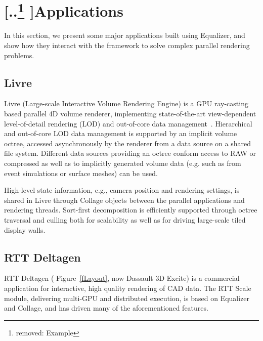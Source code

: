 \documentclass[10pt,journal,compsoc]{IEEEtran}
\newcommand{\fig}[1]{Figure~\ref{#1}}
\providecommand{\DIFaddtex}[1]{{\protect\color{blue} \sf #1}} %
\providecommand{\DIFdeltex}[1]{{\protect\color{red} [..\footnote{removed: #1} ]}} %
\providecommand{\DIFaddbegin}{} %
\providecommand{\DIFaddend}{} %
\providecommand{\DIFdelbegin}{} %
\providecommand{\DIFdelend}{} %
\providecommand{\DIFadd}[1]{\texorpdfstring{\DIFaddtex{#1}}{#1}} %
\providecommand{\DIFdel}[1]{\texorpdfstring{\DIFdeltex{#1}}{}} %
\newcommand{\DIFscaledelfig}{0.5}
\newlength{\DIFdelgraphicswidth} %
\newlength{\DIFdelgraphicsheight} %
\newcommand{\DIFaddincludegraphics}[2][]{{\color{blue}\fbox{\DIFOincludegraphics[#1]{#2}}}} %
\newcommand{\DIFdelincludegraphics}[2][]{%
\sbox{\DIFdelgraphicsbox}{\DIFOincludegraphics[#1]{#2}}%
\settoboxwidth{\DIFdelgraphicswidth}{\DIFdelgraphicsbox} %
\settoboxtotalheight{\DIFdelgraphicsheight}{\DIFdelgraphicsbox} %
\scalebox{\DIFscaledelfig}{%
\parbox[b]{\DIFdelgraphicswidth}{\usebox{\DIFdelgraphicsbox}\\[-\baselineskip] \rule{\DIFdelgraphicswidth}{0em}}\llap{\resizebox{\DIFdelgraphicswidth}{\DIFdelgraphicsheight}{%
\setlength{\unitlength}{\DIFdelgraphicswidth}%
\begin{picture}(1,1)%
\thicklines\linethickness{2pt} %
{\color[rgb]{1,0,0}\put(0,0){\framebox(1,1){}}}%
{\color[rgb]{1,0,0}\put(0,0){\line( 1,1){1}}}%
{\color[rgb]{1,0,0}\put(0,1){\line(1,-1){1}}}%
\end{picture}%
}\hspace*{3pt}}} %
} %
\DeclareRobustCommand{\DIFaddbegin}{\DIFOaddbegin \let\includegraphics\DIFaddincludegraphics} %
\DeclareRobustCommand{\DIFaddend}{\DIFOaddend \let\includegraphics\DIFOincludegraphics} %
\DeclareRobustCommand{\DIFdelbegin}{\DIFOdelbegin \let\includegraphics\DIFdelincludegraphics} %
\DeclareRobustCommand{\DIFdelend}{\DIFOaddend \let\includegraphics\DIFOincludegraphics} %
\begin{document}
\section{\DIFdelbegin \DIFdel{Example }\DIFdelend Applications} \label{sApplications}

In this section, we present some major applications built using
\textsf{Equalizer}, and show how they interact with the framework to solve
complex parallel rendering problems.

\subsection{Livre}

Livre (Large-scale Interactive Volume Rendering Engine) is a GPU ray-casting based parallel
4D volume renderer, implementing state-of-the-art view-dependent level-of-detail rendering (LOD)
and out-of-core data management~\cite{EHKRW:06}. Hierarchical and out-of-core LOD
data management is supported by an implicit volume octree, accessed asynchronously
by the renderer from a data source on a shared file system. Different data sources providing
an octree conform access to RAW or compressed as well as to implicitly generated volume data
(e.g. such as from event simulations or surface meshes) can be used.

High-level state information, e.g., camera position and rendering settings, is shared in Livre
through \textsf{Collage} objects between the parallel applications and rendering threads.
Sort-first decomposition is efficiently supported through octree traversal and culling both
for scalability as well as for driving large-scale tiled display walls.

\subsection{RTT Deltagen}

RTT Deltagen (\DIFaddbegin \DIFadd{\fig{fLayout}, }\DIFaddend now Dassault 3D Excite) is a commercial
application for interactive, high quality rendering of CAD data. The RTT Scale
module, delivering multi-GPU and distributed execution, is based on
\textsf{Equalizer} and \textsf{Collage}, and has driven many of the
aforementioned features.
\end{document}
